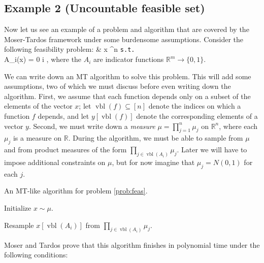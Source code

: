\documentclass{article}
\def\seqn#1\eeqn{\begin{align}#1\end{align}}
\newcommand{\hasDist}%
  {\sim}
\newcommand{\Reals}%
  {\mathbb{R}}
\begin{document}
\subsection{Example 2 (Uncountable feasible set)}
\label{subsec:uncountable}
Now let us see an example of a problem and algorithm that are covered by the Moser-Tardos framework under some burdensome assumptions.  Consider the following feasibility problem:
\seqn
  \label{prob:feas}
   & x \in \Reals^n \texttt{s.t.} \\
  A_i(x) = 0 \forall i \in [m] ,
\eeqn
where the $A_i$ are indicator functions $\Reals^{m} \to \{0,1\}$.

We can write down an MT algorithm to solve this problem.  This will add some assumptions, two of which we must discuss before even writing down the algorithm.  First, we assume that each function depends only on a subset of the elements of the vector $x$; let $\operatorname{vbl}(f) \subseteq [n]$ denote the indices on which a function $f$ depends, and let $y[\operatorname{vbl}(f)]$ denote the corresponding elements of a vector $y$.  Second, we must write down a \emph{measure} $\mu = \prod_{j=1}^{n} \mu_j$ on $\Reals^n$, where each $\mu_j$ is a measure on $\Reals$.  During the algorithm, we must be able to sample from $\mu$ and from product measures of the form $\prod_{j \in \operatorname{vbl}(A_i)} \mu_j$.  Later we will have to impose additional constraints on $\mu$, but for now imagine that $\mu_j = N(0, 1)$ for each $j$.

\begin{algorithm}[H]
\caption{An MT-like algorithm for problem \ref{prob:feas}.}
\label{alg:mt-feas}
\begin{algorithmic}[1]

\State Initialize $x \hasDist \mu$.
\EndFor

    \Return
  \EndIf
  \State Resample $x[\operatorname{vbl}(A_i)]$ from $\prod_{j \in \operatorname{vbl}(A_i)} \mu_j$.
  \EndFor
\EndFunction

\end{algorithmic}
\end{algorithm}

Moser and Tardos prove that this algorithm finishes in polynomial time under the following conditions:
\end{document}
